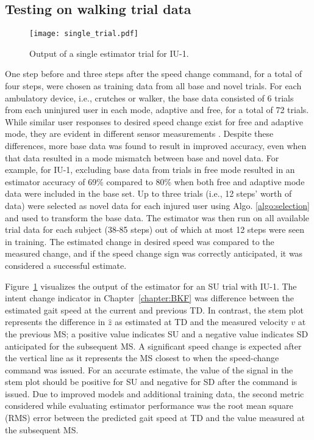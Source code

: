\subsection{Testing on walking trial data}

\begin{figure}
	\centering
	\texttt{[image: single\_trial.pdf]}
	\caption{Output of a single estimator trial for IU-1.}\label{fig:single_trial}
\end{figure}

One step before and three steps after the speed change command, for a total of four steps, were chosen as training data from all base and novel trials. For each ambulatory device, i.e., crutches or walker, the base data consisted of 6 trials from each uninjured user in each mode, adaptive and free, for a total of 72 trials. While similar user responses to desired speed change exist for free and adaptive mode, they are evident in different sensor measurements \cite{karulkar2021using}. Despite these differences, more base data was found to result in improved accuracy, even when that data resulted in a mode mismatch between base and novel data. For example, for IU-1, excluding base data from trials in free mode resulted in an estimator accuracy of 69\% compared to 80\% when both free and adaptive mode data were included in the base set. Up to three trials (i.e., 12 steps' worth of data) were selected as novel data for each injured user using Algo. \ref{algo:selection} and used to transform the base data. The estimator was then run on all available trial data for each subject (38-85 steps) out of which at most 12 steps were seen in training. The estimated change in desired speed was compared to the measured change, and if the speed change sign was correctly anticipated, it was considered a successful estimate.

Figure~\ref{fig:single_trial} visualizes the output of the estimator for an SU trial with IU-1. The intent change indicator in Chapter~\ref{chapter:BKF} was difference between the estimated gait speed at the  current and previous TD. In contrast, the stem plot represents the difference in $ \hat{z} $ as estimated at TD and the measured velocity $v$ at the previous MS; a positive value indicates SU and a negative value indicates SD anticipated for the subsequent MS. A significant speed change is expected after the vertical line as it represents the MS closest to when the speed-change command was issued. For an accurate estimate, the value of the signal in the stem plot should be positive for SU and negative for SD after the command is issued. Due to improved models and additional training data, the second metric considered while evaluating estimator performance was the root mean square (RMS) error between the predicted gait speed at TD and the value measured at the subsequent MS. 

